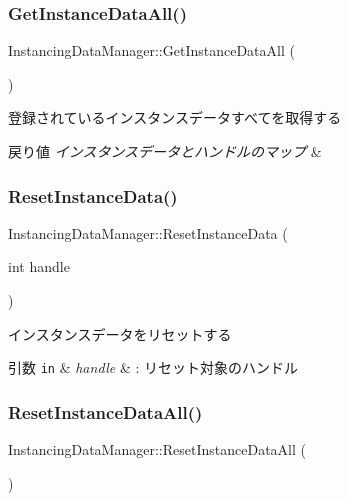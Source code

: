 \subsubsection{\texorpdfstring{Get\+Instance\+Data\+All()}{GetInstanceDataAll()}}
{\footnotesize\ttfamily Instancing\+Data\+Manager\+::\+Get\+Instance\+Data\+All (\begin{DoxyParamCaption}{ }\end{DoxyParamCaption})}

登録されているインスタンスデータすべてを取得する 
\begin{DoxyRetVals}{戻り値}
{\em インスタンスデータとハンドルのマップ} & \\
\hline
\end{DoxyRetVals}
\mbox{\label{class_instancing_data_manager_afc81462cef5a960eae978e6e56d22c98}} 
\subsubsection{\texorpdfstring{Reset\+Instance\+Data()}{ResetInstanceData()}}
{\footnotesize\ttfamily Instancing\+Data\+Manager\+::\+Reset\+Instance\+Data (\begin{DoxyParamCaption}\item[{int}]{handle }\end{DoxyParamCaption})}

インスタンスデータをリセットする 
\begin{DoxyParams}[1]{引数}
\mbox{\tt in}  & {\em handle} & \+: リセット対象のハンドル \\
\hline
\end{DoxyParams}
\mbox{\label{class_instancing_data_manager_aaf44f22cf99babd3bdd782d8e534124d}} 
\subsubsection{\texorpdfstring{Reset\+Instance\+Data\+All()}{ResetInstanceDataAll()}}
{\footnotesize\ttfamily Instancing\+Data\+Manager\+::\+Reset\+Instance\+Data\+All (\begin{DoxyParamCaption}{ }\end{DoxyParamCaption})}


